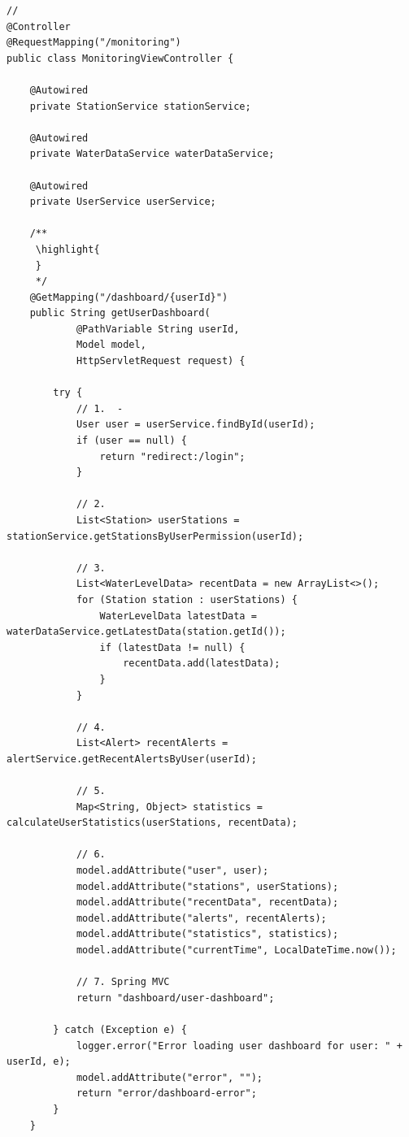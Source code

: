 \begin{lstlisting}[style=java]
// 
@Controller
@RequestMapping("/monitoring")
public class MonitoringViewController {
    
    @Autowired
    private StationService stationService;
    
    @Autowired
    private WaterDataService waterDataService;
    
    @Autowired
    private UserService userService;
    
    /**
     \highlight{ 
     } 
     */
    @GetMapping("/dashboard/{userId}")
    public String getUserDashboard(
            @PathVariable String userId, 
            Model model,
            HttpServletRequest request) {
        
        try {
            // 1.  - 
            User user = userService.findById(userId);
            if (user == null) {
                return "redirect:/login";
            }
            
            // 2. 
            List<Station> userStations = stationService.getStationsByUserPermission(userId);
            
            // 3. 
            List<WaterLevelData> recentData = new ArrayList<>();
            for (Station station : userStations) {
                WaterLevelData latestData = waterDataService.getLatestData(station.getId());
                if (latestData != null) {
                    recentData.add(latestData);
                }
            }
            
            // 4. 
            List<Alert> recentAlerts = alertService.getRecentAlertsByUser(userId);
            
            // 5. 
            Map<String, Object> statistics = calculateUserStatistics(userStations, recentData);
            
            // 6. 
            model.addAttribute("user", user);
            model.addAttribute("stations", userStations);
            model.addAttribute("recentData", recentData);
            model.addAttribute("alerts", recentAlerts);
            model.addAttribute("statistics", statistics);
            model.addAttribute("currentTime", LocalDateTime.now());
            
            // 7. Spring MVC
            return "dashboard/user-dashboard";
            
        } catch (Exception e) {
            logger.error("Error loading user dashboard for user: " + userId, e);
            model.addAttribute("error", "");
            return "error/dashboard-error";
        }
    }
    

\end{lstlisting}
